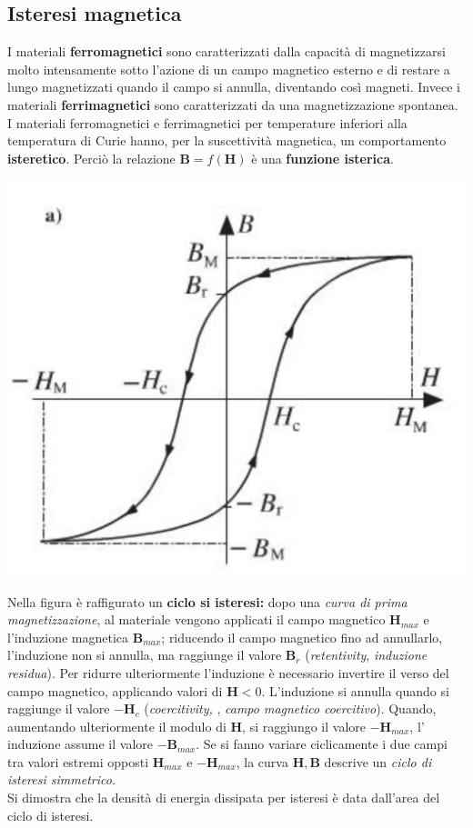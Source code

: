 \documentclass{article}
\begin{document}
\subsection{Isteresi magnetica}
I materiali \textbf{ferromagnetici} sono caratterizzati dalla capacità di magnetizzarsi molto intensamente sotto l'azione di un campo magnetico esterno e di restare a lungo magnetizzati quando il campo si annulla, diventando così magneti. Invece i materiali \textbf{ferrimagnetici} sono caratterizzati da una magnetizzazione spontanea.
\vspace*{0.1cm}\\
I materiali ferromagnetici e ferrimagnetici per temperature inferiori alla temperatura di Curie hanno, per la suscettività magnetica, un comportamento \textbf{isteretico}. Perciò la relazione $\mathbf{B} = f(\mathbf{H})$ è una \textbf{funzione isterica}.\\
\begin{center}
    \includegraphics[scale=0.27]{Image/Isteresi_magnetica_2.png}
\end{center}
Nella figura è raffigurato un \textbf{ciclo si isteresi:} dopo una \textit{curva di prima magnetizzazione}, al materiale vengono applicati il campo magnetico $\mathbf{H}_{max}$ e l'induzione magnetica $\mathbf{B}_{max}$; riducendo il campo magnetico fino ad annullarlo, l'induzione non si annulla, ma raggiunge il valore $\mathbf{B}_r$ (\textit{retentivity}, \textit{induzione residua}). Per ridurre ulteriormente l'induzione è necessario invertire il verso del campo magnetico, applicando valori di $\mathbf{H}<0$. L'induzione si annulla quando si raggiunge il valore $-\mathbf{H}_c$ (\textit{coercitivity, }, \textit{campo magnetico coercitivo}). Quando, aumentando ulteriormente il modulo di $\mathbf{H}$, si raggiungo il valore $-\mathbf{H}_{max}$, l' induzione assume il valore $-\mathbf{B}_{max}$. Se si fanno variare ciclicamente i due campi tra valori estremi opposti $\mathbf{H}_{max}$ e $-\mathbf{H}_{max}$, la curva $\mathbf{H},\mathbf{B}$ descrive un \textit{ciclo di isteresi simmetrico}.
\vspace*{0.1cm}\\
Si dimostra che la densità di energia dissipata per isteresi è data dall'area del ciclo di isteresi.
\end{document}
